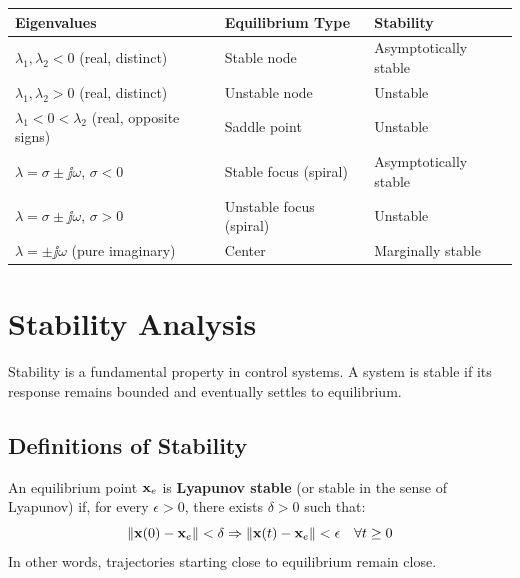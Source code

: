 \begin{center}
\begin{tabular}{lll}
\toprule
\textbf{Eigenvalues} & \textbf{Equilibrium Type} & \textbf{Stability} \\
\midrule
$\lambda_1, \lambda_2 < 0$ (real, distinct) & Stable node & Asymptotically stable \\
$\lambda_1, \lambda_2 > 0$ (real, distinct) & Unstable node & Unstable \\
$\lambda_1 < 0 < \lambda_2$ (real, opposite signs) & Saddle point & Unstable \\
$\lambda = \sigma \pm \jj\omega$, $\sigma < 0$ & Stable focus (spiral) & Asymptotically stable \\
$\lambda = \sigma \pm \jj\omega$, $\sigma > 0$ & Unstable focus (spiral) & Unstable \\
$\lambda = \pm\jj\omega$ (pure imaginary) & Center & Marginally stable \\
\bottomrule
\end{tabular}
\end{center}



\section{Stability Analysis}
\label{sec:stability}

Stability is a fundamental property in control systems. A system is stable if its response remains bounded and eventually settles to equilibrium.

\subsection{Definitions of Stability}

\begin{definitionbox}[title=Definition: Lyapunov Stability]
An equilibrium point $\mathbf{x}_e$ is \textbf{Lyapunov stable} (or stable in the sense of Lyapunov) if, for every $\epsilon > 0$, there exists $\delta > 0$ such that:
\begin{equation}
\|\mathbf{x}(0) - \mathbf{x}_e\| < \delta \Rightarrow \|\mathbf{x}(t) - \mathbf{x}_e\| < \epsilon \quad \forall t \geq 0
\end{equation}
In other words, trajectories starting close to equilibrium remain close.
\end{definitionbox}

